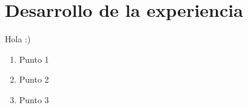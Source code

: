 \section{Desarrollo de la experiencia}
Hola :)

\begin{enumerate}
    \item Punto 1
    \item Punto 2
    \item Punto 3
\end{enumerate}